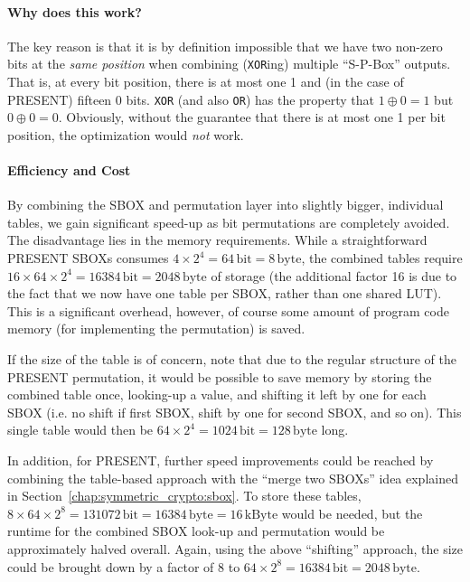 \paragraph{Why does this work?} 
The key reason is that it is by definition impossible that we have two non-zero bits at the \emph{same position} when combining (\verb+XOR+ing) multiple ``S-P-Box'' outputs. That is, at every bit position, there is at most one 1 and (in the case of PRESENT) fifteen 0 bits. \verb+XOR+ (and also \verb+OR+) has the property that $1 \oplus 0 = 1$ but $0 \oplus 0 = 0$. Obviously, without the guarantee that there is at most one 1 per bit position, the optimization would \emph{not} work.

\paragraph{Efficiency and Cost}
By combining the \ac{SBOX} and permutation layer into slightly bigger, individual tables, we gain significant speed-up as bit permutations are completely avoided. The disadvantage lies in the memory requirements. While a straightforward PRESENT \acp{SBOX} consumes $4 \times 2^4 = 64\,\textrm{bit} = 8\,\textrm{byte}$, the combined tables require $16 \times 64 \times 2^4 = 16384\,\textrm{bit} = 2048\,\textrm{byte}$ of storage (the additional factor 16 is due to the fact that we now have one table per \ac{SBOX}, rather than one shared \ac{LUT}). This is a significant overhead, however, of course some amount of program code memory (for implementing the permutation) is saved. 

If the size of the table is of concern, note that due to the regular structure of the PRESENT permutation, it would be possible to save memory by storing the combined table once, looking-up a value, and shifting it left by one for each \ac{SBOX} (i.e. no shift if first \ac{SBOX}, shift by one for second \ac{SBOX}, and so on). This single table would then be $64 \times 2^4 = 1024\,\textrm{bit} = 128\,\textrm{byte}$ long.

In addition, for PRESENT, further speed improvements could be reached by combining the table-based approach with the ``merge two \acp{SBOX}'' idea explained in Section~\ref{chap:symmetric_crypto:sbox}. To store these tables, $8 \times 64 \times 2^8 = 131072\,\textrm{bit} = 16384\,\textrm{byte} = 16\,\textrm{kByte}$ would be needed, but the runtime for the combined \ac{SBOX} look-up and permutation would be approximately halved overall. Again, using the above ``shifting'' approach, the size could be brought down by a factor of 8 to $64 \times 2^8 = 16384\,\textrm{bit} = 2048\,\textrm{byte}$.

